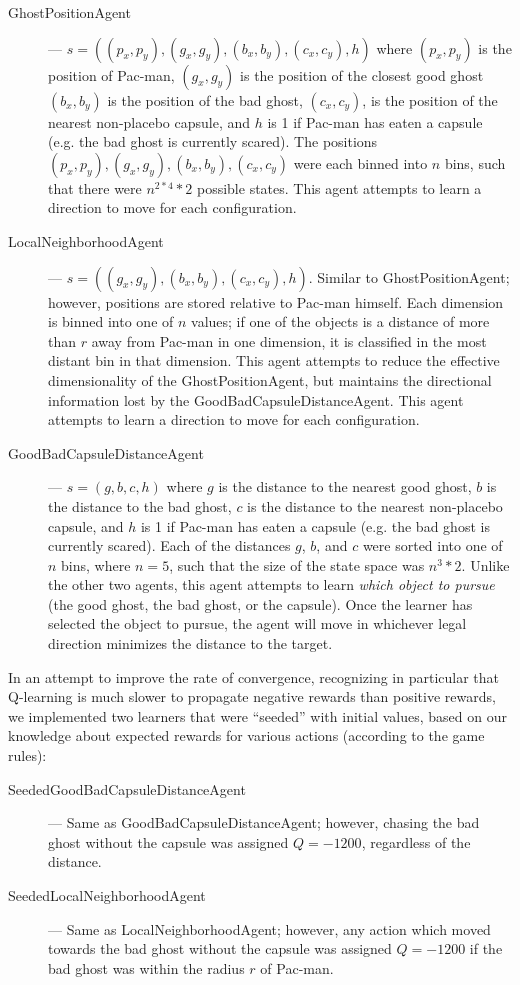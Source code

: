 \documentclass[11pt]{amsart}
\begin{document}
\begin{description}
	\item[GhostPositionAgent] --- $s = ((p_x, p_y), (g_x, g_y), (b_x, b_y), (c_x, c_y), h)$ where $(p_x, p_y)$ is the position of Pac-man, $(g_x, g_y)$ is the position of the closest good ghost $(b_x, b_y)$ is the position of the bad ghost, $(c_x, c_y)$, is the position of the nearest non-placebo capsule, and $h$ is 1 if Pac-man has eaten a capsule (e.g. the bad ghost is currently scared). The positions $(p_x, p_y), (g_x, g_y), (b_x, b_y), (c_x, c_y)$ were each binned into $n$ bins, such that there were $n^{2 * 4} * 2$ possible states. This agent attempts to learn a direction to move for each configuration.
	\item[LocalNeighborhoodAgent] --- $s = ((g_x, g_y), (b_x, b_y), (c_x, c_y), h)$. Similar to GhostPositionAgent; however, positions are stored relative to Pac-man himself. Each dimension is binned into one of $n$ values; if one of the objects is a distance of more than $r$ away from Pac-man in one dimension, it is classified in the most distant bin in that dimension. This agent attempts to reduce the effective dimensionality of the GhostPositionAgent, but maintains the directional information lost by the GoodBadCapsuleDistanceAgent. This agent attempts to learn a direction to move for each configuration.
	\item[GoodBadCapsuleDistanceAgent] --- $s = (g, b, c, h)$ where $g$ is the distance to the nearest good ghost, $b$ is the distance to the bad ghost, $c$ is the distance to the nearest non-placebo capsule, and $h$ is 1 if Pac-man has eaten a capsule (e.g. the bad ghost is currently scared). Each of the distances $g$, $b$, and $c$ were sorted into one of $n$ bins, where $n = 5$, such that the size of the state space was $n^3 * 2$. Unlike the other two agents, this agent attempts to learn \emph{which object to pursue} (the good ghost, the bad ghost, or the capsule). Once the learner has selected the object to pursue, the agent will move in whichever legal direction minimizes the distance to the target.  
\end{description}

In an attempt to improve the rate of convergence, recognizing in particular that Q-learning is much slower to propagate negative rewards than positive rewards, we implemented two learners that were ``seeded'' with initial values, based on our knowledge about expected rewards for various actions (according to the game rules):

\begin{description}
	\item[SeededGoodBadCapsuleDistanceAgent] --- Same as GoodBadCapsuleDistanceAgent; however, chasing the bad ghost without the capsule was assigned $Q = -1200$, regardless of the distance.
	\item[SeededLocalNeighborhoodAgent] --- Same as LocalNeighborhoodAgent; however, any action which moved towards the bad ghost without the capsule was assigned $Q = -1200$ if the bad ghost was within the radius $r$ of Pac-man.
\end{description}
\end{document}
